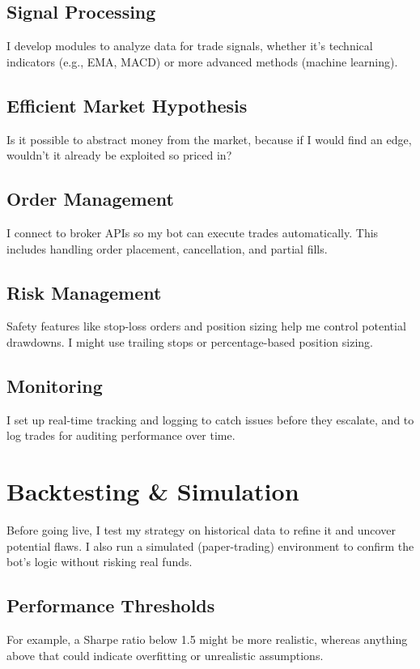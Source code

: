 \documentclass[9pt,a4paper,twocolumn,twoside]{tau-class/tau}
\begin{document}
\subsection{Signal Processing}
I develop modules to analyze data for trade signals, whether it's technical 
indicators (e.g., EMA, MACD) or more advanced methods (machine learning). 


\subsection{Efficient Market Hypothesis}
Is it possible to abstract money from the market, because if I would find an edge,
wouldn't it already be exploited so priced in?


\subsection{Order Management}
I connect to broker APIs so my bot can execute trades automatically. This 
includes handling order placement, cancellation, and partial fills.

\subsection{Risk Management}
Safety features like stop-loss orders and position sizing help me control 
potential drawdowns. I might use trailing stops or percentage-based 
position sizing.

\subsection{Monitoring}
I set up real-time tracking and logging to catch issues before they escalate, 
and to log trades for auditing performance over time.

\section{Backtesting \& Simulation}

Before going live, I test my strategy on historical data to refine it and 
uncover potential flaws. I also run a simulated (paper-trading) environment 
to confirm the bot’s logic without risking real funds. 

\subsection{Performance Thresholds}
For example, a Sharpe ratio below 1.5 might be more realistic, whereas 
anything above that could indicate overfitting or unrealistic assumptions.
\end{document}
